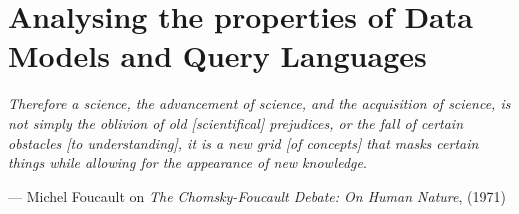 \chapter{Analysing the properties of Data Models and Query Languages}\label{cha:datadef}


\epigraph{\textit{Therefore a science, the advancement of science, and the acquisition of science, is not simply the oblivion of old [scientifical] prejudices, or the fall of certain obstacles [to understanding], it is a new grid [of concepts] that masks certain things while allowing for the appearance of new knowledge}.}{--- Michel Foucault on \textit{The Chomsky-Foucault Debate: On Human Nature}, (1971)}



